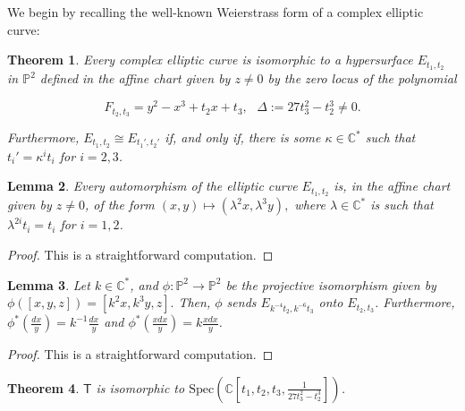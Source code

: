 \documentclass{article}
\numberwithin{equation}{section}
\numberwithin{figure}{section}
\theoremstyle{plain}
\newtheorem{theorem}{Theorem}[section]
\newtheorem{lemma}[theorem]{Lemma}
\theoremstyle{definition}
\numberwithin{equation}{section}
\newtheorem[S, bodystyle=\normalfont\noindent]{defiS}{Definition}[section]
\begin{document}
We begin by recalling the well-known Weierstrass form of a complex elliptic curve:
\begin{theorem}\label{weierstrass}
Every complex elliptic curve is isomorphic to a hypersurface  $E_{t_1,t_2}$ in $\mathbb{P}^2$ defined in the affine chart given by $z\neq0$ by the zero locus of the polynomial 

\begin{equation}
F_{t_2,t_3}=y^2-x^3+t_2x+t_3,\,\,\,\,   \Delta:=27t_3^2-t_2^3\neq 0.
\end{equation}

Furthermore, $E_{t_1,t_2}\cong E_{t_1',t_2'}$ if, and only if, there is some $\kappa\in\mathbb{C}^*$ such that $t_i'=\kappa^it_i$ for $i=2,3$.
\end{theorem}

\begin{lemma}\label{automorphism} 
Every automorphism of the elliptic curve $E_{t_1,t_2}$ is, in the affine chart given by $z\neq 0$, of the form $(x,y)\mapsto(\lambda^2x,\lambda^3y),$ where $\lambda\in \mathbb{C}^*$ is such that $\lambda^{2i}t_i=t_i$ for $i=1,2$.
\end{lemma}
\begin{proof}
This is a straightforward computation.
\end{proof}

\begin{lemma}\label{second}
Let $k\in \mathbb{C}^{*}$, and $\phi:\mathbb{P}^2\rightarrow \mathbb{P}^2$ be the projective isomorphism given by $\phi
([x,y,z])=[k^2x,k^3y,z].$ Then, $\phi$ sends $E_{k^{-4}t_2,k^{-6}t_3}$ onto $E_{t_2,t_3}$. Furthermore, $\phi^*(\frac{dx}{y})=k^{-1}\frac{dx}{y}$ and $\phi^*(\frac{xdx}{y})=k\frac{xdx}{y}$.
\end{lemma}
\begin{proof}
This is a straightforward computation.
\end{proof}


\begin{theorem}
$\mathsf{T}$ is isomorphic to  $\text{Spec}(\mathbb{C}[t_1,t_2,t_3,\frac{1}{27t_3^2-t_2^3}])$. 
\end{theorem}
\end{document}
